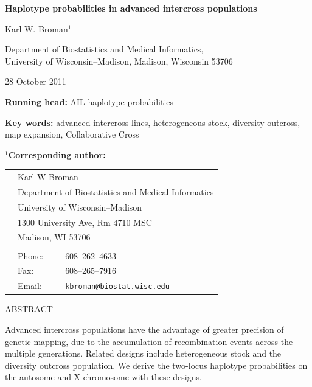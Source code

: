 \documentclass[12pt,letterpaper,pdftex]{article}
\begin{document}

\vspace*{1in}

\begin{center}
\textbf{\Large Haplotype probabilities in
advanced intercross populations}

\bigskip \bigskip \bigskip \bigskip 
 
{\large Karl W. Broman$^1$

\bigskip \bigskip

Department of Biostatistics and Medical Informatics, \\
University of Wisconsin--Madison, Madison, Wisconsin 53706 }
\end{center}


\vfill

\hfill 
{\footnotesize 28 October 2011}

\newpage

\noindent \textbf{Running head:} AIL haplotype probabilities


\bigskip \bigskip \bigskip

\noindent \textbf{Key words:} advanced intercross lines, heterogeneous
stock, diversity outcross, map expansion, Collaborative Cross



\bigskip \bigskip \bigskip

\noindent \textbf{$^1$Corresponding author:}

\begin{tabular}{lll}
 \\
 \hspace{1cm} & \multicolumn{2}{l}{Karl W Broman} \\
 & \multicolumn{2}{l}{Department of Biostatistics and Medical Informatics} \\
 & \multicolumn{2}{l}{University of Wisconsin--Madison} \\
 & \multicolumn{2}{l}{1300 University Ave, Rm 4710 MSC} \\
 & \multicolumn{2}{l}{Madison, WI 53706} \\
 \\
 & Phone: & 608--262--4633 \\
 & Fax: & 608--265--7916 \\
 & Email: & \verb|kbroman@biostat.wisc.edu|
\end{tabular}



\clearpage
\centerline{ABSTRACT} 
  
Advanced intercross populations have the advantage
of greater precision of genetic mapping, due to the
accumulation of recombination events across the multiple generations.  Related designs include
heterogeneous stock and the diversity outcross population.
We derive the two-locus haplotype probabilities on the autosome and X
chromosome with these designs.
\end{document}
